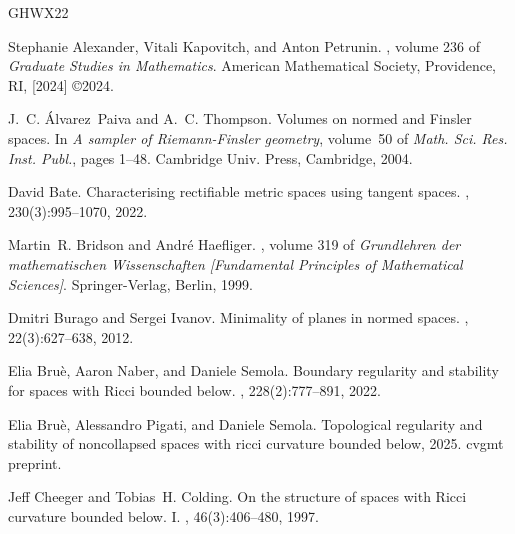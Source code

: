 \documentclass[a4paper,leqno]{amsart}
\numberwithin{equation}{section}
\theoremstyle{remark}
\theoremstyle{remark}
\begin{document}

\begin{thebibliography}{GHWX22}

Stephanie Alexander, Vitali Kapovitch, and Anton Petrunin.
, volume 236 of {\em Graduate Studies in Mathematics}.
\newblock American Mathematical Society, Providence, RI, [2024] \copyright 2024.

J.~C. \'Alvarez~Paiva and A.~C. Thompson.
\newblock Volumes on normed and {F}insler spaces.
\newblock In {\em A sampler of {R}iemann-{F}insler geometry}, volume~50 of {\em Math. Sci. Res. Inst. Publ.}, pages 1--48. Cambridge Univ. Press, Cambridge, 2004.

David Bate.
\newblock Characterising rectifiable metric spaces using tangent spaces.
, 230(3):995--1070, 2022.

Martin~R. Bridson and Andr\'e Haefliger.
, volume 319 of {\em Grundlehren der mathematischen Wissenschaften [Fundamental Principles of Mathematical Sciences]}.
\newblock Springer-Verlag, Berlin, 1999.

Dmitri Burago and Sergei Ivanov.
\newblock Minimality of planes in normed spaces.
, 22(3):627--638, 2012.

Elia Bru\`e, Aaron Naber, and Daniele Semola.
\newblock Boundary regularity and stability for spaces with {R}icci bounded below.
, 228(2):777--891, 2022.

Elia Bruè, Alessandro Pigati, and Daniele Semola.
\newblock Topological regularity and stability of noncollapsed spaces with ricci curvature bounded below, 2025.
\newblock cvgmt preprint.

Jeff Cheeger and Tobias~H. Colding.
\newblock On the structure of spaces with {R}icci curvature bounded below. {I}.
, 46(3):406--480, 1997.


\end{thebibliography}
\end{document}
